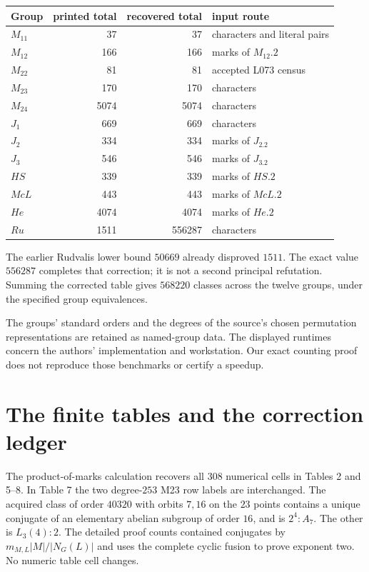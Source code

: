 \documentclass[11pt]{article}
\begin{document}
\begin{center}\small
\begin{tabular}{lrrl}
\toprule
Group & printed total & recovered total & input route\\\midrule
$M_{11}$&37&37&characters and literal pairs\\
$M_{12}$&166&166&marks of $M_{12}.2$\\
$M_{22}$&81&81&accepted L073 census\\
$M_{23}$&170&170&characters\\
$M_{24}$&5074&5074&characters\\
$J_1$&669&669&characters\\
$J_2$&334&334&marks of $J_2.2$\\
$J_3$&546&546&marks of $J_3.2$\\
$HS$&339&339&marks of $HS.2$\\
$McL$&443&443&marks of $McL.2$\\
$He$&4074&4074&marks of $He.2$\\
$Ru$&1511&556287&characters\\\bottomrule
\end{tabular}
\end{center}
The earlier Rudvalis lower bound $50669$ already disproved $1511$.
The exact value $556287$ completes that correction; it is not a second
principal refutation. Summing the corrected table gives $568220$ classes
across the twelve groups, under the specified group equivalences.

The groups' standard orders and the degrees of the source's chosen
permutation representations are retained as named-group data. The displayed
runtimes concern the authors' implementation and workstation. Our exact
counting proof does not reproduce those benchmarks or certify a speedup.

\section{The finite tables and the correction ledger}
The product-of-marks calculation recovers all $308$ numerical cells in
Tables 2 and 5--8. In Table 7 the two degree-$253$ M23 row labels are
interchanged. The acquired class of order $40320$ with orbits $7,16$ on
the $23$ points contains a unique conjugate of an elementary abelian
subgroup of order $16$, and is $2^4:A_7$. The other is $L_3(4):2$.
The detailed proof counts contained conjugates by
$m_{M,L}|M|/|N_G(L)|$ and uses the complete cyclic fusion to prove exponent
two. No numeric table cell changes.
\end{document}
